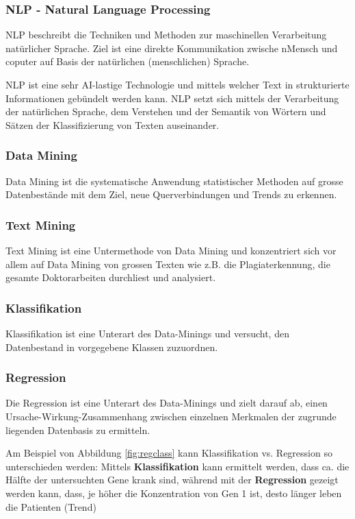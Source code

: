 \documentclass[a4paper, 11pt, nofootinbib]{article}
\begin{document}
\subsubsection{NLP - Natural Language Processing}
 NLP beschreibt die Techniken und Methoden zur maschinellen Verarbeitung natürlicher Sprache. Ziel ist eine direkte Kommunikation zwische nMensch und coputer auf Basis der natürlichen (menschlichen) Sprache.

NLP ist eine sehr AI-lastige Technologie und mittels welcher Text in strukturierte Informationen gebündelt werden kann. NLP setzt sich mittels der Verarbeitung der natürlichen Sprache, dem Verstehen und der Semantik von 
Wörtern und Sätzen der Klassifizierung von Texten auseinander.

\subsubsection{Data Mining}
 Data Mining ist die systematische Anwendung statistischer Methoden auf grosse Datenbestände mit dem Ziel, neue Querverbindungen und Trends zu erkennen.

\subsubsection{Text Mining}
 Text Mining ist eine Untermethode von Data Mining und konzentriert sich vor allem auf Data Mining von grossen Texten wie z.B. die Plagiaterkennung, die gesamte Doktorarbeiten durchliest und analysiert.
 
 \subsubsection{Klassifikation}
 Klassifikation ist eine Unterart des Data-Minings und versucht, den Datenbestand in vorgegebene Klassen zuzuordnen.
 
 \subsubsection{Regression}
 Die Regression ist eine Unterart des Data-Minings und zielt darauf ab, einen Ursache-Wirkung-Zusammenhang zwischen einzelnen Merkmalen der zugrunde liegenden Datenbasis zu ermitteln. 
 
 Am Beispiel von Abbildung \ref{fig:regclass} kann Klassifikation vs. Regression so unterschieden werden: Mittels \textbf{Klassifikation} kann ermittelt werden, dass ca. die Hälfte der untersuchten Gene krank sind, während mit der \textbf{Regression} gezeigt werden kann, dass, je höher die Konzentration von Gen 1 ist, desto länger leben die Patienten (Trend)
 
\end{document}
